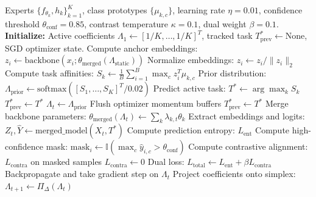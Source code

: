 \documentclass{article}
\theoremstyle{plain}
\theoremstyle{definition}
\theoremstyle{remark}
\begin{document}
\begin{algorithm}[H]
\caption{Class-Prototype Contrastive Alignment with Dynamic Reset (CP-CADR)}
\label{alg:cpcadr}
\begin{algorithmic}[1]
\REQUIRE Experts $\{f_{\theta_k}, h_k\}_{k=1}^K$, class prototypes $\{\mu_{k,c}\}$, learning rate $\eta=0.01$, confidence threshold $\theta_{\text{conf}}=0.85$, contrast temperature $\kappa=0.1$, dual weight $\beta=0.1$.
\STATE \textbf{Initialize:} Active coefficients $\Lambda_1 \leftarrow [1/K, \dots, 1/K]^T$, tracked task $T^*_{\text{prev}} \leftarrow \text{None}$, SGD optimizer state.
    \STATE Compute anchor embeddings: $z_i \leftarrow \text{backbone}(x_i; \theta_{\text{merged}}(\Lambda_{\text{static}}))$
    \STATE Normalize embeddings: $z_i \leftarrow z_i / \|z_i\|_2$
    \STATE Compute task affinities: $S_k \leftarrow \frac{1}{B} \sum_{i=1}^B \max_c z_i^T \mu_{k,c}$
    \STATE Prior distribution: $\Lambda_{\text{prior}} \leftarrow \text{softmax}([S_1, \dots, S_K]^T / 0.02)$
    \STATE Predict active task: $T^* \leftarrow \arg\max_k S_k$
        \STATE $T^*_{\text{prev}} \leftarrow T^*$
        \STATE {}
        \STATE $\Lambda_t \leftarrow \Lambda_{\text{prior}}$
        \STATE Flush optimizer momentum buffers
        \STATE $T^*_{\text{prev}} \leftarrow T^*$
    \ENDIF
    \STATE Merge backbone parameters: $\theta_{\text{merged}}(\Lambda_t) \leftarrow \sum_k \lambda_{k,t} \theta_k$
    \STATE Extract embeddings and logits: $Z_t, \hat{Y} \leftarrow \text{merged\_model}(X_t, T^*)$
    \STATE Compute prediction entropy: $L_{\text{ent}}$
    \STATE Compute high-confidence mask: $\text{mask}_i \leftarrow \mathbb{I}(\max_c \hat{y}_{i,c} > \theta_{\text{conf}})$
        \STATE Compute contrastive alignment: $L_{\text{contra}}$ on masked samples
    \ELSE
        \STATE $L_{\text{contra}} \leftarrow 0$
    \ENDIF
    \STATE Dual loss: $L_{\text{total}} \leftarrow L_{\text{ent}} + \beta L_{\text{contra}}$
    \STATE Backpropagate and take gradient step on $\Lambda_t$
    \STATE Project coefficients onto simplex: $\Lambda_{t+1} \leftarrow \Pi_\Delta(\Lambda_t)$
\ENDFOR
\end{algorithmic}
\end{algorithm}
\end{document}
